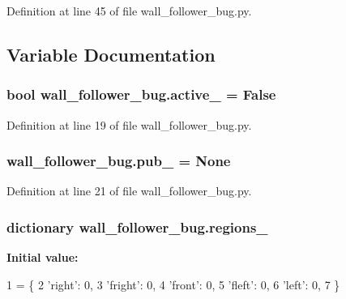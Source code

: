Definition at line 45 of file wall\+\_\+follower\+\_\+bug.\+py.



\subsection{Variable Documentation}
\subsubsection[{\texorpdfstring{active\+\_\+}{active_}}]{\setlength{\rightskip}{0pt plus 5cm}bool wall\+\_\+follower\+\_\+bug.\+active\+\_\+ = False}\hypertarget{namespacewall__follower__bug_aae52d8b35c7f252ef4da619eb924a1eb}{}\label{namespacewall__follower__bug_aae52d8b35c7f252ef4da619eb924a1eb}


Definition at line 19 of file wall\+\_\+follower\+\_\+bug.\+py.

\subsubsection[{\texorpdfstring{pub\+\_\+}{pub_}}]{\setlength{\rightskip}{0pt plus 5cm}wall\+\_\+follower\+\_\+bug.\+pub\+\_\+ = None}\hypertarget{namespacewall__follower__bug_af857c0a3244763f5e201f37452696767}{}\label{namespacewall__follower__bug_af857c0a3244763f5e201f37452696767}


Definition at line 21 of file wall\+\_\+follower\+\_\+bug.\+py.

\subsubsection[{\texorpdfstring{regions\+\_\+}{regions_}}]{\setlength{\rightskip}{0pt plus 5cm}dictionary wall\+\_\+follower\+\_\+bug.\+regions\+\_\+}\hypertarget{namespacewall__follower__bug_acb8af6367eac655a9899a840a3c89eae}{}\label{namespacewall__follower__bug_acb8af6367eac655a9899a840a3c89eae}
{\bfseries Initial value\+:}
\begin{DoxyCode}
1 = \{
2     \textcolor{stringliteral}{'right'}: 0,
3     \textcolor{stringliteral}{'fright'}: 0,
4     \textcolor{stringliteral}{'front'}: 0,
5     \textcolor{stringliteral}{'fleft'}: 0,
6     \textcolor{stringliteral}{'left'}: 0,
7 \}
\end{DoxyCode}


